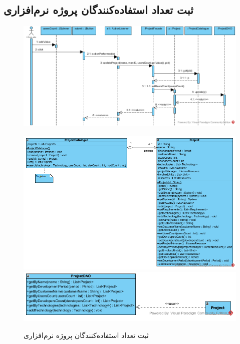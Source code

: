 \begin{landscape}
\newpage
\section{ثبت تعداد استفاده‌کنندگان پروژه نرم‌افزاری}
\begin{figure}[H]
	\centering
	\includegraphics[scale=0.8]{img/sequence-design/AddUsersCount}
\end{figure}
\begin{figure}[H]
	\centering
	\includegraphics[scale=0.6]{img/sequence-design/AddUsersCountC}
	\includegraphics[scale=0.6]{img/sequence-design/AddUsersCountD}
	\caption{ثبت تعداد استفاده‌کنندگان پروژه نرم‌افزاری}
\end{figure}

\newpage

\end{landscape}

